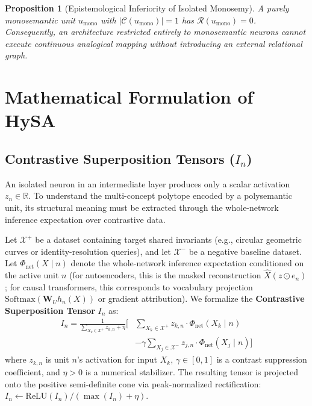\documentclass[10pt,twocolumn]{article}
\newtheorem{proposition}{Proposition}
\theoremstyle{definition}
\begin{document}
\begin{proposition}[Epistemological Inferiority of Isolated Monosemy]
A purely monosemantic unit $u_{\mathrm{mono}}$ with $|\mathcal{C}(u_{\mathrm{mono}})| = 1$ has $\mathcal{R}(u_{\mathrm{mono}}) = 0$. Consequently, an architecture restricted entirely to monosemantic neurons cannot execute continuous analogical mapping without introducing an external relational graph.
\end{proposition}

\section{Mathematical Formulation of HySA}

\subsection{Contrastive Superposition Tensors (\texorpdfstring{$I_n$}{In})}
An isolated neuron in an intermediate layer produces only a scalar activation $z_n \in \mathbb{R}$. To understand the multi-concept polytope encoded by a polysemantic unit, its structural meaning must be extracted through the whole-network inference expectation over contrastive data.

Let $\mathcal{X}^+$ be a dataset containing target shared invariants (e.g., circular geometric curves or identity-resolution queries), and let $\mathcal{X}^-$ be a negative baseline dataset. Let $\Phi_{\mathrm{net}}(X \mid n)$ denote the whole-network inference expectation conditioned on the active unit $n$ (for autoencoders, this is the masked reconstruction $\hat{X}(z \odot e_n)$; for causal transformers, this corresponds to vocabulary projection $\mathrm{Softmax}(\mathbf{W}_U h_n(X))$ or gradient attribution). We formalize the \textbf{Contrastive Superposition Tensor} $I_n$ as:
\begin{equation}
\begin{aligned}
    I_n = \frac{1}{\sum_{X_k \in \mathcal{X}^+} z_{k,n} + \eta} \Bigg[ & \sum_{X_k \in \mathcal{X}^+} z_{k,n} \cdot \Phi_{\mathrm{net}}(X_k \mid n) \\
    & - \gamma \sum_{X_j \in \mathcal{X}^-} z_{j,n} \cdot \Phi_{\mathrm{net}}(X_j \mid n) \Bigg]
\end{aligned}
\label{eq:imprinted_tensor}
\end{equation}
where $z_{k,n}$ is unit $n$'s activation for input $X_k$, $\gamma \in [0, 1]$ is a contrast suppression coefficient, and $\eta > 0$ is a numerical stabilizer. The resulting tensor is projected onto the positive semi-definite cone via peak-normalized rectification: $I_n \leftarrow \mathrm{ReLU}(I_n) / (\max(I_n) + \eta)$.
\end{document}
